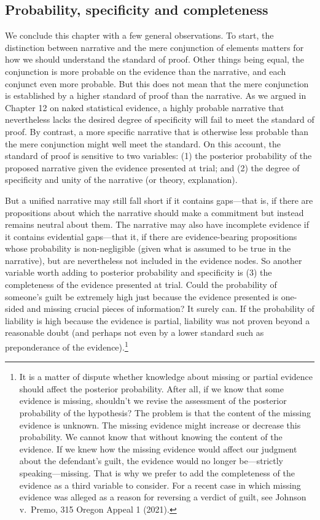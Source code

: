 \documentclass[
  10pt,
  dvipsnames,enabledeprecatedfontcommands]{scrartcl}
\begin{document}
\hypertarget{probability-specificity-and-completeness}{%
\subsection{Probability, specificity and
completeness}\label{probability-specificity-and-completeness}}

We conclude this chapter with a few general observations. To start, the
distinction between narrative and the mere conjunction of elements
matters for how we should understand the standard of proof. Other things
being equal, the conjunction is more probable on the evidence than the
narrative, and each conjunct even more probable. But this does not mean
that the mere conjunction is established by a higher standard of proof
than the narrative. As we argued in Chapter 12 on naked statistical
evidence, a highly probable narrative that nevertheless lacks the
desired degree of specificity will fail to meet the standard of proof.
By contrast, a more specific narrative that is otherwise less probable
than the mere conjunction might well meet the standard. On this account,
the standard of proof is sensitive to two variables: (1) the posterior
probability of the proposed narrative given the evidence presented at
trial; and (2) the degree of specificity and unity of the narrative (or
theory, explanation).

But a unified narrative may still fall short if it contains gaps---that
is, if there are propositions about which the narrative should make a
commitment but instead remains neutral about them. The narrative may
also have incomplete evidence if it contains evidential gaps---that it,
if there are evidence-bearing propositions whose probability is
non-negligible (given what is assumed to be true in the narrative), but
are nevertheless not included in the evidence nodes. So another variable
worth adding to posterior probability and specificity is (3) the
completeness of the evidence presented at trial. Could the probability
of someone's guilt be extremely high just because the evidence presented
is one-sided and missing crucial pieces of information? It surely can.
If the probability of liability is high because the evidence is partial,
liability was not proven beyond a reasonable doubt (and perhaps not even
by a lower standard such as preponderance of the evidence).\footnote{It
  is a matter of dispute whether knowledge about missing or partial
  evidence should affect the posterior probability. After all, if we
  know that some evidence is missing, shouldn't we revise the assessment
  of the posterior probability of the hypothesis? The problem is that
  the content of the missing evidence is unknown. The missing evidence
  might increase or decrease this probability. We cannot know that
  without knowing the content of the evidence. If we knew how the
  missing evidence would affect our judgment about the defendant's
  guilt, the evidence would no longer be---strictly speaking---missing.
  That is why we prefer to add the completeness of the evidence as a
  third variable to consider. For a recent case in which missing
  evidence was alleged as a reason for reversing a verdict of guilt, see
  Johnson v.~Premo, 315 Oregon Appeal 1 (2021).}
\end{document}
